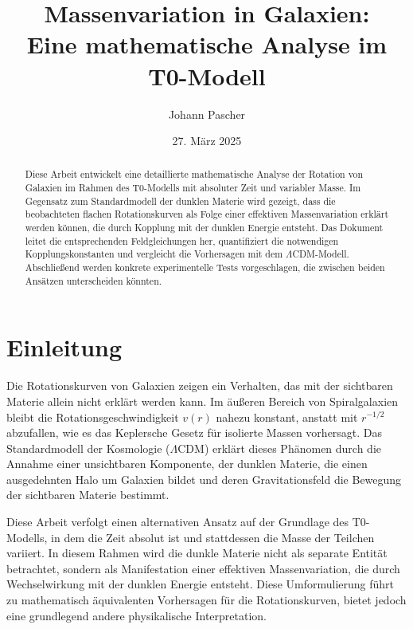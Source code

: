 \documentclass[a4paper,12pt]{article}
\begin{document}
	
	\title{Massenvariation in Galaxien: \\Eine mathematische Analyse im T0-Modell}
	\author{Johann Pascher}
	\date{27. März 2025}
	\maketitle
	
	\begin{abstract}
		Diese Arbeit entwickelt eine detaillierte mathematische Analyse der Rotation von Galaxien im Rahmen des T0-Modells mit absoluter Zeit und variabler Masse. Im Gegensatz zum Standardmodell der dunklen Materie wird gezeigt, dass die beobachteten flachen Rotationskurven als Folge einer effektiven Massenvariation erklärt werden können, die durch Kopplung mit der dunklen Energie entsteht. Das Dokument leitet die entsprechenden Feldgleichungen her, quantifiziert die notwendigen Kopplungskonstanten und vergleicht die Vorhersagen mit dem $\Lambda$CDM-Modell. Abschließend werden konkrete experimentelle Tests vorgeschlagen, die zwischen beiden Ansätzen unterscheiden könnten.
	\end{abstract}
	
	\tableofcontents
	\newpage
	
	\section{Einleitung}
	
	Die Rotationskurven von Galaxien zeigen ein Verhalten, das mit der sichtbaren Materie allein nicht erklärt werden kann. Im äußeren Bereich von Spiralgalaxien bleibt die Rotationsgeschwindigkeit $v(r)$ nahezu konstant, anstatt mit $r^{-1/2}$ abzufallen, wie es das Keplersche Gesetz für isolierte Massen vorhersagt. Das Standardmodell der Kosmologie ($\Lambda$CDM) erklärt dieses Phänomen durch die Annahme einer unsichtbaren Komponente, der dunklen Materie, die einen ausgedehnten Halo um Galaxien bildet und deren Gravitationsfeld die Bewegung der sichtbaren Materie bestimmt.
	
	Diese Arbeit verfolgt einen alternativen Ansatz auf der Grundlage des T0-Modells, in dem die Zeit absolut ist und stattdessen die Masse der Teilchen variiert. In diesem Rahmen wird die dunkle Materie nicht als separate Entität betrachtet, sondern als Manifestation einer effektiven Massenvariation, die durch Wechselwirkung mit der dunklen Energie entsteht. Diese Umformulierung führt zu mathematisch äquivalenten Vorhersagen für die Rotationskurven, bietet jedoch eine grundlegend andere physikalische Interpretation.
	
\end{document}
